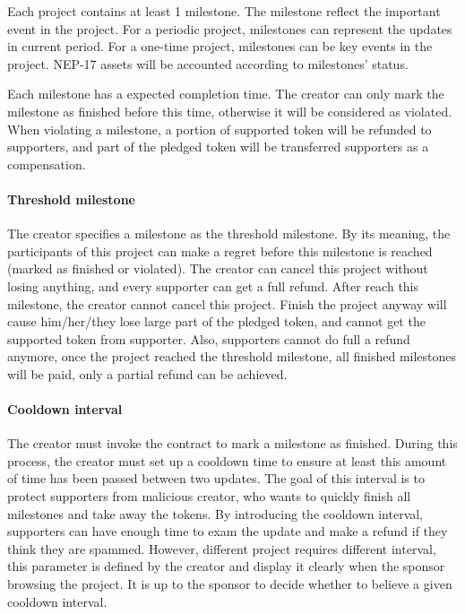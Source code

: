 Each project contains at least 1 milestone.
The milestone reflect the important event in the project.
For a periodic project, milestones can represent the updates in current period.
For a one-time project, milestones can be key events in the project.
NEP-17 assets will be accounted according to milestones' status.

Each milestone has a expected completion time.
The creator can only mark the milestone as finished before this time, otherwise
it will be considered as violated.
When violating a milestone, a portion of supported token will be refunded to supporters,
and part of the pledged token will be transferred supporters as a compensation.

\paragraph{Threshold milestone}

The creator specifies a milestone as the threshold milestone.
By its meaning, the participants of this project can make a regret before this
milestone is reached (marked as finished or violated).
The creator can cancel this project without losing anything, and every supporter
can get a full refund.
After reach this milestone, the creator cannot cancel this project.
Finish the project anyway will cause him/her/they lose large part of the pledged
token, and cannot get the supported token from supporter.
Also, supporters cannot do full a refund anymore, once the project reached the
threshold milestone, all finished milestones will be paid, only a partial refund
can be achieved.

\paragraph{Cooldown interval}

The creator must invoke the contract to mark a milestone as finished.
During this process, the creator must set up a cooldown time to ensure
at least this amount of time has been passed between two updates.
The goal of this interval is to protect supporters from malicious creator,
who wants to quickly finish all milestones and take away the tokens.
By introducing the cooldown interval, supporters can have enough time to
exam the update and make a refund if they think they are spammed.
However, different project requires different interval, this parameter is defined
by the creator and display it clearly when the sponsor browsing the project.
It is up to the sponsor to decide whether to believe a given cooldown interval.

